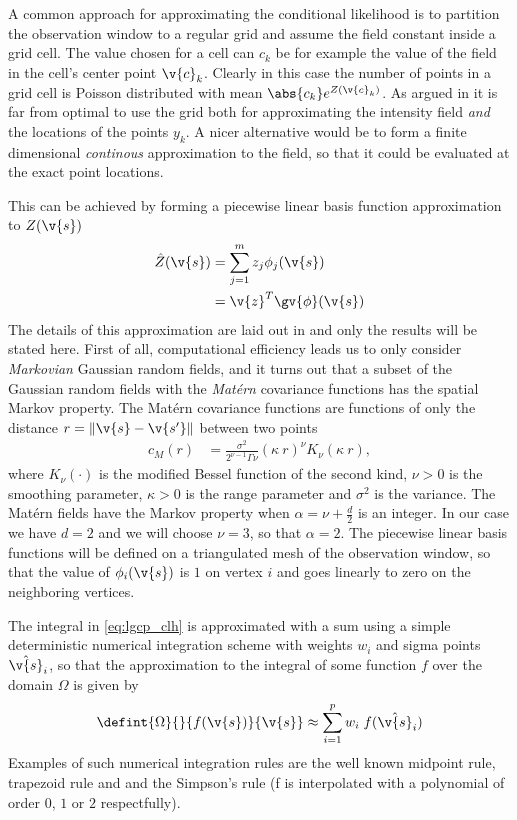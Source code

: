 \documentclass[12pt,a4paper,oneside,article]{memoir}
\begin{document}
A common approach for approximating the conditional likelihood is to partition the observation window
to a regular grid and assume the field constant inside a grid cell. The value chosen for a cell
can $c_{k}$ be for example the value of the field in the cell's center point $\v{c}_k$. Clearly in this case
the number of points in a grid cell is Poisson distributed with mean $\abs{c_{k}}e^{Z(\v{c}_k)}$.
As argued in \cite{Simpson2011} it is far from optimal to use the grid both for approximating
the intensity field \emph{and} the locations of the points $y_k$. A nicer alternative would be to 
form a finite dimensional \emph{continous} approximation to the field, so that it could be evaluated at 
the exact point locations.

This can be achieved by forming a piecewise linear basis function approximation to $Z(\v{s})$
\begin{align}
	\hat{Z}(\v{s})&=\sum_{j=1}^m z_j\phi_j(\v{s})\\
	&=\v{z}^T\gv{\phi}(\v{s})
	\label{eq:field_approximation}
\end{align}
The details of this approximation are laid out in \cite{Simpson2011a} and only the results
will be stated here. First of all, computational efficiency leads us to only consider \emph{Markovian}
Gaussian random fields, and it turns out that a subset of the Gaussian random fields
with the \emph{Matérn} covariance functions has the spatial Markov property. 
The Matérn covariance functions are functions of only the distance $r=\|\v{s}-\v{s'}\|$
between two points
\begin{align}
	c_M(r)&=\frac{\sigma^2}{2^{\nu-1}\Gamma{\nu}}(\kappa\:r)^{\nu} K_{\nu}(\kappa\:r),
	\label{eq:matern}
\end{align}
where $K_{\nu}(\cdot)$ is the modified Bessel function of the second kind, $\nu>0$ is 
the smoothing parameter, $\kappa > 0$ is the range parameter and $\sigma^2$ is the variance.
The Matérn fields have the Markov property when $\alpha=\nu+\frac{d}{2}$ is an integer. In our case
we have $d=2$ and we will choose $\nu=3$, so that $\alpha=2$. The piecewise linear basis functions
will be defined on a triangulated mesh of the observation window, so that the value of
$\phi_i(\v{s})$ is $1$ on vertex $i$ and goes linearly to zero on the neighboring vertices.

The integral in \eqref{eq:lgcp_clh} is approximated with a sum using a simple
deterministic numerical integration scheme with weights $w_i$ and sigma
points $\hat{\v{s}}_i$, so that the approximation to the integral of some function $f$
over the domain $\Omega$ is given by
\begin{align}
	\defint{\Omega}{}{f(\v{s})}{\v{s}}\approx \sum_{i=1}^p w_i\;f(\hat{\v{s}}_i)
	\label{eq:integ_approx_general}
\end{align}
Examples of such numerical integration rules are the well known midpoint rule, trapezoid rule and 
and the Simpson's rule (f is interpolated with a polynomial of order $0$, $1$ or $2$ respectfully).
\end{document}
